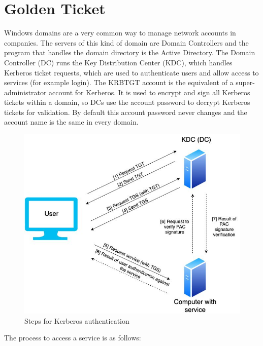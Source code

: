 \section{Golden Ticket}
Windows domains are a very common way to manage network accounts in companies. The servers of this kind of domain are Domain Controllers and the program that handles the domain directory is the Active Directory. The Domain Controller (DC) runs the Key Distribution Center (KDC), which handles Kerberos ticket requests, which are used to authenticate users and allow access to services (for example login).
\linej
The KRBTGT account is the equivalent of a super-administrator account for Kerberos. It is used to encrypt and sign all Kerberos tickets within a domain, so DCs use the account password to decrypt Kerberos tickets for validation.
By default this account password never changes and the account name is the same in every domain\cite{stealthbits}.
\linej
\begin{figure}[H]
	\label{kerberos_exchange}
	\centering
	\includegraphics[width=.8\textwidth]{figuras/TGT_TGS_PAC.jpg}
	\caption{Steps for Kerberos authentication}
\end{figure}
\linej
The process to access a service is as follows\cite{tarlogic_theory}\cite{tarlogic_comprehension}\cite{events_1}:

